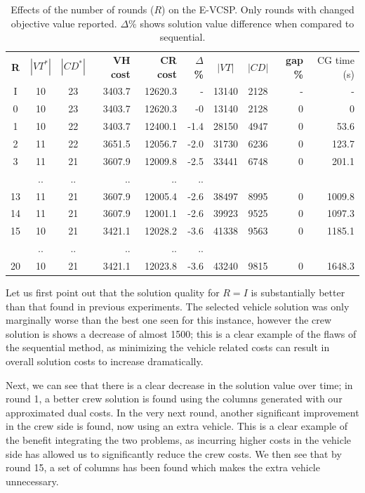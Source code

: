 \documentclass[]{article}
\begin{document}
\begin{table}[h]
  \centering
  \begin{tabular}{cccrrrccrr}
    \toprule
       \textbf{R} & $|VT^*|$ & $|CD^*|$ & \textbf{VH cost} & \textbf{CR cost} & \textbf{$\Delta$\%} & $|VT|$ & $|CD|$ & \textbf{gap \%} & CG time (s) \\
       \cmidrule(lr){1-1} \cmidrule(lr){2-6} \cmidrule(lr){7-8} \cmidrule(lr){9-10}
        I   & 10 & 23 & 3403.7 & 12620.3 & -     & 13140 & 2128 & - & -      \\
        0   & 10 & 23 & 3403.7 & 12620.3 & -0    & 13140 & 2128 & 0 & 0      \\
        1   & 10 & 22 & 3403.7 & 12400.1 & -1.4  & 28150 & 4947 & 0 & 53.6   \\
        2   & 11 & 22 & 3651.5 & 12056.7 & -2.0  & 31730 & 6236 & 0 & 123.7  \\
        3   & 11 & 21 & 3607.9 & 12009.8 & -2.5  & 33441 & 6748 & 0 & 201.1  \\
            & .. & .. & .. & .. & .. & \\
        13  & 11 & 21 & 3607.9 & 12005.4 & -2.6  & 38497 & 8995 & 0 & 1009.8 \\
        14  & 11 & 21 & 3607.9 & 12001.1 & -2.6  & 39923 & 9525 & 0 & 1097.3 \\
        15  & 10 & 21 & 3421.1 & 12028.2 & -3.6  & 41338 & 9563 & 0 & 1185.1 \\
            & .. & .. & .. & .. & .. & \\
        20  & 10 & 21 & 3421.1 & 12023.8 & -3.6  & 43240 & 9815 & 0 & 1648.3 \\
        \bottomrule
  \end{tabular}
  \caption{Effects of the number of rounds ($R$) on the E-VCSP. Only rounds with changed objective value reported. $\Delta$\% shows solution value difference when compared to sequential. }
  \label{tab:evcsp-rounds}
\end{table}
Let us first point out that the solution quality for $R=I$ is substantially better than that found in previous experiments. The selected vehicle solution was only marginally worse than the best one seen for this instance, however the crew solution is shows a decrease of almost 1500; this is a clear example of the flaws of the sequential method, as minimizing the vehicle related costs can result in overall solution costs to increase dramatically.

Next, we can see that there is a clear decrease in the solution value over time; in round 1, a better crew solution is found using the columns generated with our approximated dual costs. In the very next round, another significant improvement in the crew side is found, now using an extra vehicle. This is a clear example of the benefit integrating the two problems, as incurring higher costs in the vehicle side has allowed us to significantly reduce the crew costs. We then see that by round 15, a set of columns has been found which makes the extra vehicle unnecessary. 
\end{document}
